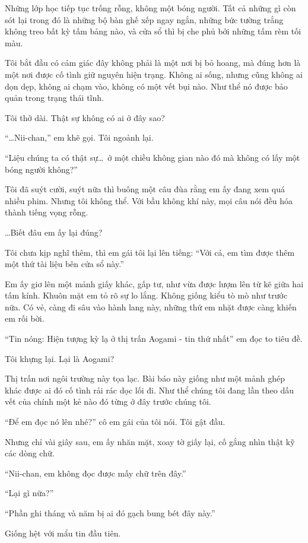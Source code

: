 \documentclass[../main.tex]{subfiles}
\begin{document}
Những lớp học tiếp tục trống rỗng, không một bóng người. Tất cả những gì còn sót lại trong đó là những bộ bàn ghế xếp ngay ngắn, những bức tường trắng không treo bất kỳ tấm bảng nào, và cửa sổ thì bị che phủ bởi những tấm rèm tối màu.

Tôi bắt đầu có cảm giác đây không phải là một nơi bị bỏ hoang, mà đúng hơn là một nơi được cố tình giữ nguyên hiện trạng. Không ai sống, nhưng cũng không ai dọn dẹp, không ai chạm vào, không có một vết bụi nào. Như thể nó được bảo quản trong trạng thái tĩnh.

Tôi thở dài. Thật sự không có ai ở đây sao?

``\dots Nii-chan,'' em khẽ gọi. Tôi ngoảnh lại.

``Liệu chúng ta có thật sự\dots\ ở một chiều không gian nào đó mà không có lấy một bóng người không?''

Tôi đã suýt cười, suýt nữa thì buông một câu đùa rằng em ấy đang xem quá nhiều phim. Nhưng tôi không thể. Với bầu không khí này, mọi câu nói đều hóa thành tiếng vọng rỗng.

\dots Biết đâu em ấy lại đúng?

Tôi chưa kịp nghĩ thêm, thì em gái tôi lại lên tiếng: ``Với cả, em tìm được thêm một thứ tài liệu bên cửa sổ này.''

Em ấy giơ lên một mảnh giấy khác, gấp tư, như vừa được lượm lên từ kẽ giữa hai tấm kính. Khuôn mặt em tỏ rõ sự lo lắng. Không giống kiểu tò mò như trước nữa. Có vẻ, càng đi sâu vào hành lang này, những thứ em nhặt được càng khiến em rối bời.

``{\vnmsans Tin nóng: Hiện tượng kỳ lạ ở thị trấn Aogami - tin thứ nhất}'' em đọc to tiêu đề.

Tôi khựng lại. Lại là Aogami?

Thị trấn nơi ngôi trường này tọa lạc. Bài báo này giống như một mảnh ghép khác được ai đó cố tình rải rác dọc lối đi. Như thể chúng tôi đang lần theo dấu vết của chính một kẻ nào đó từng ở đây trước chúng tôi.

``Để em đọc nó lên nhé?'' cô em gái của tôi nói. Tôi gật đầu.

Nhưng chỉ vài giây sau, em ấy nhăn mặt, xoay tờ giấy lại, cố gắng nhìn thật kỹ các dòng chữ.

``Nii-chan, em không đọc được mấy chữ trên đây.''

``Lại gì nữa?''

``Phần ghi tháng và năm bị ai đó gạch bung bét đây này.''

Giống hệt với mẩu tin đầu tiên.
\end{document}
